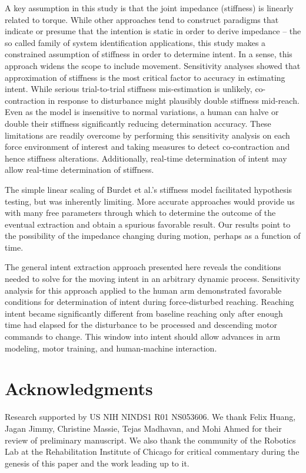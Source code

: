 A key assumption in this study is that the joint impedance (stiffness) is linearly related to torque. While other approaches tend to construct paradigms that indicate or presume that the intention is static in order to derive impedance -- the so called family of system identification applications, this study makes a constrained assumption of stiffness in order to determine intent. In a sense, this approach widens the scope to include movement. Sensitivity analyses showed that approximation of stiffness is the most critical factor to accuracy in estimating intent. While serious trial-to-trial stiffness mis-estimation is unlikely, co-contraction in response to disturbance might plausibly double stiffness mid-reach. Even as the model is insensitive to normal variations, a human can halve or double their stiffness \cite{franklin2007endpoint} significantly reducing determination accuracy. These limitations are readily overcome by performing this sensitivity analysis on each force environment of interest and taking measures to detect co-contraction and hence stiffness alterations. Additionally, real-time determination of intent may allow real-time determination of stiffness.

The simple linear scaling of Burdet et al.'s stiffness model \cite{burdet2006stability} facilitated hypothesis testing, but was inherently limiting. More accurate approaches would provide us with many free parameters through which to determine the outcome of the eventual extraction and obtain a spurious favorable result. Our results point to the possibility of the impedance changing during motion, perhaps as a function of time. 

The general intent extraction approach presented here reveals the conditions needed to solve for the moving intent in an arbitrary dynamic process. Sensitivity analysis for this approach applied to the human arm demonstrated favorable conditions for determination of intent during force-disturbed reaching. Reaching intent became significantly different from baseline reaching only after enough time had elapsed for the disturbance to be processed and descending motor commands to change. This window into intent should allow advances in arm modeling, motor training, and human-machine interaction.


\section*{Acknowledgments}
Research supported by US NIH NINDS1 R01 NS053606.  We thank Felix Huang, Jagan Jimmy, Christine Massie, Tejas Madhavan, and Mohi Ahmed for their review of preliminary manuscript. We also thank the community  of the Robotics Lab at the Rehabilitation Institute of Chicago for critical commentary during the genesis of this paper and the work leading up to it.

